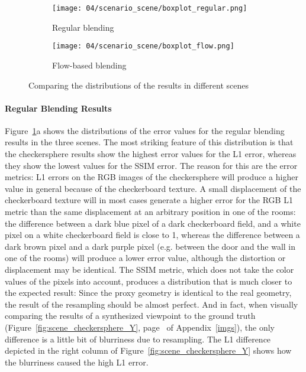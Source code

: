 \begin{figure}
\centering
    \hfill
    \begin{subfigure}[b]{0.45\textwidth}
            \centering
            \texttt{[image: 04/scenario\_scene/boxplot\_regular.png]}
            \caption{Regular blending}
    \end{subfigure}
    \hfill
    \begin{subfigure}[b]{0.45\textwidth}
            \centering
            \texttt{[image: 04/scenario\_scene/boxplot\_flow.png]}
            \caption{Flow-based blending}
    \end{subfigure}
    \hfill
  \caption{Comparing the distributions of the results in different scenes}
  \label{fig:scene_boxplot_split}
\end{figure}

\paragraph{Regular Blending Results}
Figure~\ref{fig:scene_boxplot_split}a shows the distributions of the error values for the regular blending results in the three scenes. The most striking feature of this distribution is that the checkersphere results show the highest error values for the L1 error, whereas they show the lowest values for the SSIM error. The reason for this are the error metrics: L1 errors on the RGB images of the checkersphere will produce a higher value in general because of the checkerboard texture. A small displacement of the checkerboard texture will in most cases generate a higher error for the RGB L1 metric than the same displacement at an arbitrary position in one of the rooms: the difference between a dark blue pixel of a dark checkerboard field, and a white pixel on a white checkerboard field is close to 1, whereas the difference between a dark brown pixel and a dark purple pixel (e.g. between the door and the wall in one of the rooms) will produce a lower error value, although the distortion or displacement may be identical. The SSIM metric, which does not take the color values of the pixels into account, produces a distribution that is much closer to the expected result: Since the proxy geometry is identical to the real geometry, the result of the resampling should be almost perfect. And in fact, when visually comparing the results of a synthesized viewpoint to the ground truth (Figure~\ref{fig:scene_checkersphere_Y}, page~\pageref{fig:scene_checkersphere_Y} of Appendix~\ref{imgs}), the only difference is a little bit of blurriness due to resampling. The L1 difference depicted in the right column of Figure~\ref{fig:scene_checkersphere_Y} shows how the blurriness caused the high L1 error.

